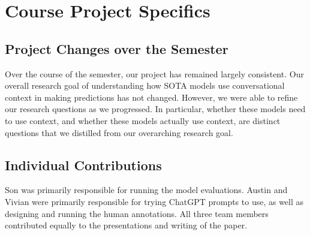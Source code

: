 \section{Course Project Specifics}

\subsection{Project Changes over the Semester}

Over the course of the semester, our project has remained largely consistent.
Our overall research goal of understanding how SOTA models use conversational context in making predictions has not changed.
However, we were able to refine our research questions as we progressed.
In particular, whether these models need to use context, and whether these models actually use context, are distinct questions that we distilled from our overarching research goal.

\subsection{Individual Contributions}
Son was primarily responsible for running the model evaluations. 
Austin and Vivian were primarily responsible for trying ChatGPT prompts to use, as well as designing and running the human annotations.
All three team members contributed equally to the presentations and writing of the paper.

